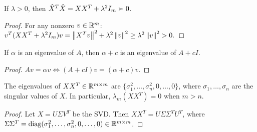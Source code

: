 \begin{lemma}
\label{lemma:fullrank}
If $\lambda > 0$, then $\hat{X}^T\hat{X} = XX^T + \lambda^2 I_m \succ 0$.
\end{lemma}
\begin{proof}
For any nonzero $v \in \mathbb{R}^m$:
$v^T(XX^T + \lambda^2 I_m)v = \left\|X^T v\right\|^2 + \lambda^2\left\|v\right\|^2 \geq \lambda^2\left\|v\right\|^2 > 0.$
\end{proof}

\begin{lemma}
\label{lemma:eigenvalues}
If $\alpha$ is an eigenvalue of $A$, then $\alpha + c$ is an eigenvalue of $A + cI$.
\end{lemma}
\begin{proof}
$Av = \alpha v \iff (A + cI)v = (\alpha + c)v.$
\end{proof}

\begin{lemma}
\label{lemma:singvals}
The eigenvalues of $XX^T \in \mathbb{R}^{m \times m}$ are 
$\{\sigma_1^2, \ldots, \sigma_n^2, 0, \ldots, 0\}$, where $\sigma_1, \ldots, \sigma_n$ 
are the singular values of $X$.
In particular, $\lambda_m(XX^T) = 0$ when $m > n$.
\end{lemma}
\begin{proof}
Let $X = U\Sigma V^T$ be the SVD.
Then $XX^T = U\Sigma\Sigma^T U^T$, 
where $\Sigma\Sigma^T = \operatorname{diag}(\sigma_1^2, \ldots, \sigma_n^2, 0, \ldots, 0) \in \mathbb{R}^{m \times m}$.
\end{proof}